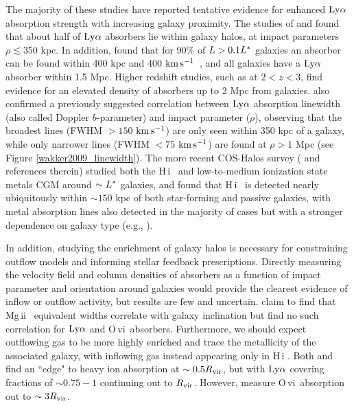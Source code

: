 \documentclass[twocolumn,tighten]{aastex62}
\newcommand{\kms}{$\rm km\, s^{-1}$}
\newcommand{\HI}{\mbox{H\,{\sc i}} }
\newcommand{\II}{\,{\sc ii}}
\newcommand{\VI}{\,{\sc vi}}
\begin{document}
The majority of these studies have reported tentative evidence for enhanced $\rm Ly\alpha$ absorption strength with increasing galaxy proximity. The studies of \cite{cote2005} and \cite{prochaska2006} found that about half of $\rm Ly\alpha$ absorbers lie within galaxy halos, at impact parameters $\rho \lesssim 350$ kpc. In addition, \cite{wakker2009} found that for 90\% of $L > 0.1 L^{\**}$ galaxies an absorber can be found within 400 kpc and 400 \kms~, and all galaxies have a $\rm Ly\alpha$ absorber within 1.5 Mpc. Higher redshift studies, such as \cite{rudie2012a} at $2 < z < 3$, find evidence for an elevated density of absorbers up to 2 Mpc from galaxies. \cite{wakker2009} also confirmed a previously suggested correlation between $\rm Ly\alpha$ absorption linewidth (also called Doppler $b$-parameter) and impact parameter ($\rho$), observing that the broadest lines (FWHM $>150$ \kms) are only seen within 350 kpc of a galaxy, while only narrower lines (FWHM $<75$ \kms) are found at $\rho > 1$ Mpc (see Figure \ref{wakker2009_linewidth}). The more recent COS-Halos survey (\citealt{tumlinson2013} and references therein) studied both the \HI~and low-to-medium ionization state metals CGM around $\sim L^{\**}$ galaxies, and found that \HI~is detected nearly ubiquitously within $\sim150$ kpc of both star-forming and passive galaxies, with metal absorption lines also detected in the majority of cases but with a stronger dependence on galaxy type (e.g., \citealt{tumlinson2011b, werk2013}). 


In addition, studying the enrichment of galaxy halos is necessary for constraining outflow models and informing stellar feedback prescriptions. Directly measuring the velocity field and column densities of absorbers as a function of impact parameter and orientation around galaxies would provide the clearest evidence of inflow or outflow activity, but results are few and uncertain. \cite{kacprzak2011_inclination} claim to find that Mg\II~ equivalent widths correlate with galaxy inclination but \cite{mathes2014} find no such correlation for $\rm Ly\alpha$ and O\VI~absorbers. Furthermore, we should expect outflowing gas to be more highly enriched and trace the metallicity of the associated galaxy, with inflowing gas instead appearing only in \HI. Both \cite{stocke2013} and \cite{liang2014} find an ``edge" to heavy ion absorption at $\sim 0.5 R_{\rm vir}$, but with $\rm Ly\alpha$ covering fractions of $\sim 0.75 - 1$ continuing out to $R_{\rm vir}$. However, \cite{mathes2014} measure O\VI~absorption out to $\sim 3 R_{\rm vir}$.
\end{document}

